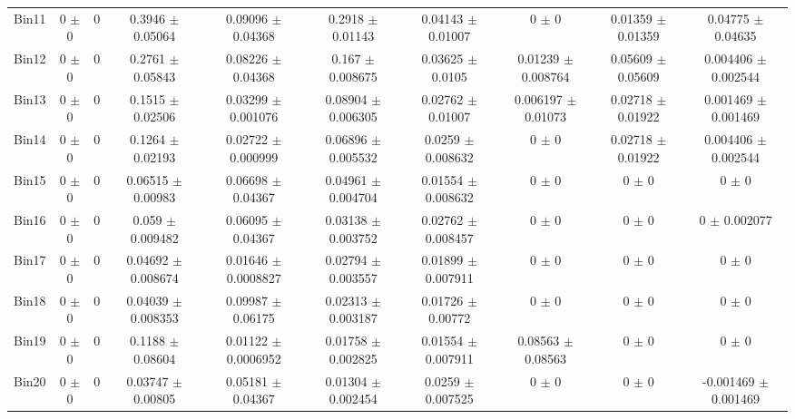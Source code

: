 \begin{tabular}{@{\extracolsep{4pt}}lccccccccc@{}}
     Bin11 & 0 $\pm$ 0 & 0 & 0.3946 $\pm$ 0.05064 & 0.09096 $\pm$ 0.04368 & 0.2918 $\pm$ 0.01143 & 0.04143 $\pm$ 0.01007 & 0 $\pm$ 0 & 0.01359 $\pm$ 0.01359 & 0.04775 $\pm$ 0.04635 \\ 
     Bin12 & 0 $\pm$ 0 & 0 & 0.2761 $\pm$ 0.05843 & 0.08226 $\pm$ 0.04368 & 0.167 $\pm$ 0.008675 & 0.03625 $\pm$ 0.0105 & 0.01239 $\pm$ 0.008764 & 0.05609 $\pm$ 0.05609 & 0.004406 $\pm$ 0.002544 \\ 
     Bin13 & 0 $\pm$ 0 & 0 & 0.1515 $\pm$ 0.02506 & 0.03299 $\pm$ 0.001076 & 0.08904 $\pm$ 0.006305 & 0.02762 $\pm$ 0.01007 & 0.006197 $\pm$ 0.01073 & 0.02718 $\pm$ 0.01922 & 0.001469 $\pm$ 0.001469 \\ 
     Bin14 & 0 $\pm$ 0 & 0 & 0.1264 $\pm$ 0.02193 & 0.02722 $\pm$ 0.000999 & 0.06896 $\pm$ 0.005532 & 0.0259 $\pm$ 0.008632 & 0 $\pm$ 0 & 0.02718 $\pm$ 0.01922 & 0.004406 $\pm$ 0.002544 \\ 
     Bin15 & 0 $\pm$ 0 & 0 & 0.06515 $\pm$ 0.00983 & 0.06698 $\pm$ 0.04367 & 0.04961 $\pm$ 0.004704 & 0.01554 $\pm$ 0.008632 & 0 $\pm$ 0 & 0 $\pm$ 0 & 0 $\pm$ 0 \\ 
     Bin16 & 0 $\pm$ 0 & 0 & 0.059 $\pm$ 0.009482 & 0.06095 $\pm$ 0.04367 & 0.03138 $\pm$ 0.003752 & 0.02762 $\pm$ 0.008457 & 0 $\pm$ 0 & 0 $\pm$ 0 & 0 $\pm$ 0.002077 \\ 
     Bin17 & 0 $\pm$ 0 & 0 & 0.04692 $\pm$ 0.008674 & 0.01646 $\pm$ 0.0008827 & 0.02794 $\pm$ 0.003557 & 0.01899 $\pm$ 0.007911 & 0 $\pm$ 0 & 0 $\pm$ 0 & 0 $\pm$ 0 \\ 
     Bin18 & 0 $\pm$ 0 & 0 & 0.04039 $\pm$ 0.008353 & 0.09987 $\pm$ 0.06175 & 0.02313 $\pm$ 0.003187 & 0.01726 $\pm$ 0.00772 & 0 $\pm$ 0 & 0 $\pm$ 0 & 0 $\pm$ 0 \\ 
     Bin19 & 0 $\pm$ 0 & 0 & 0.1188 $\pm$ 0.08604 & 0.01122 $\pm$ 0.0006952 & 0.01758 $\pm$ 0.002825 & 0.01554 $\pm$ 0.007911 & 0.08563 $\pm$ 0.08563 & 0 $\pm$ 0 & 0 $\pm$ 0 \\ 
     Bin20 & 0 $\pm$ 0 & 0 & 0.03747 $\pm$ 0.00805 & 0.05181 $\pm$ 0.04367 & 0.01304 $\pm$ 0.002454 & 0.0259 $\pm$ 0.007525 & 0 $\pm$ 0 & 0 $\pm$ 0 & -0.001469 $\pm$ 0.001469 \\ 
\hline\hline
  \end{tabular}

